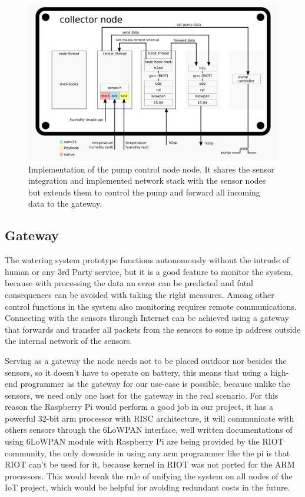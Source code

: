 \documentclass[11pt,paper=a4,parskip=half]{scrartcl}
\begin{document}
  \begin{figure}[h]
    \centering
    \includegraphics[width=\textwidth]{stack-collector}
	  \caption{Implementation of the pump control node node. It shares the sensor
	  integration and implemented network stack with the sensor nodes but
	  extends them to control the pump and forward all incoming data to the
	  gateway.}
    \label{fig:stack_sensor}
  \end{figure}

\subsection{Gateway}

The watering system prototype functions autonomously without the intrude of
human or any 3rd Party service, but it is a good feature to monitor the system,
because with processing the data an error can be predicted and fatal
consequences can be avoided with taking the right measures. Among other control
functions in the system also monitoring requires remote communications.
Connecting with the sensors through Internet can be achieved using a gateway
that forwards and transfer all packets from the sensors to some ip address
outside the internal network of the sensors.

Serving as a gateway the node
needs not to be placed outdoor nor besides the sensors, so it doesn't have to
operate on battery, this means that using a high-end programmer as the gateway
for our use-case is possible, because unlike the sensors, we need only one host
for the gateway in the real scenario. For this reason the Raspberry Pi would
perform a good job in our project, it has a powerful 32-bit arm processor with
RISC architecture, it will communicate with others sensors through the 6LoWPAN
interface, well written documentations of using 6LoWPAN module with Raspberry Pi
are being provided by the RIOT community, the only downside in using any arm
programmer like the pi is that RIOT can't be used for it, because kernel in
RIOT was not ported for the ARM processors. This would break the rule of
unifying the system on all nodes of the IoT project, which would be helpful for
avoiding redundant costs in the future.
\end{document}
